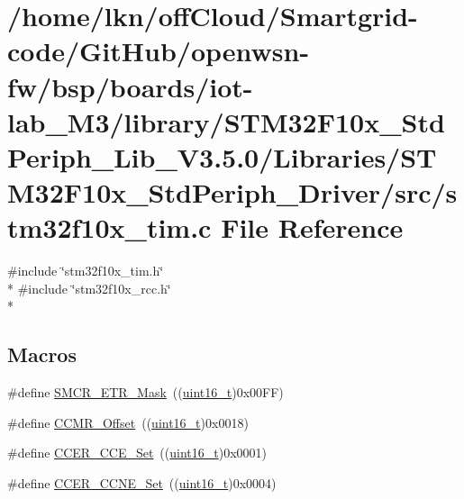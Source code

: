 \hypertarget{iot-lab___m3_2library_2_s_t_m32_f10x___std_periph___lib___v3_85_80_2_libraries_2_s_t_m32_f10x___d7bea007d76ff35c2645db50144a93b3}{}\section{/home/lkn/off\+Cloud/\+Smartgrid-\/code/\+Git\+Hub/openwsn-\/fw/bsp/boards/iot-\/lab\+\_\+\+M3/library/\+S\+T\+M32\+F10x\+\_\+\+Std\+Periph\+\_\+\+Lib\+\_\+\+V3.5.0/\+Libraries/\+S\+T\+M32\+F10x\+\_\+\+Std\+Periph\+\_\+\+Driver/src/stm32f10x\+\_\+tim.c File Reference}
\label{iot-lab___m3_2library_2_s_t_m32_f10x___std_periph___lib___v3_85_80_2_libraries_2_s_t_m32_f10x___d7bea007d76ff35c2645db50144a93b3}
{\ttfamily \#include \char`\"{}stm32f10x\+\_\+tim.\+h\char`\"{}}\\*
{\ttfamily \#include \char`\"{}stm32f10x\+\_\+rcc.\+h\char`\"{}}\\*
\subsection*{Macros}
\begin{DoxyCompactItemize}
\item 
\#define \hyperlink{group___t_i_m___private___defines_ga43819484b70fd8f2f2aa02d4131c9841}{S\+M\+C\+R\+\_\+\+E\+T\+R\+\_\+\+Mask}~((\hyperlink{_p_e___types_8h_a1f1825b69244eb3ad2c7165ddc99c956}{uint16\+\_\+t})0x00\+F\+F)
\item 
\#define \hyperlink{group___t_i_m___private___defines_ga76469c9f56da4e7705336a6ac0248196}{C\+C\+M\+R\+\_\+\+Offset}~((\hyperlink{_p_e___types_8h_a1f1825b69244eb3ad2c7165ddc99c956}{uint16\+\_\+t})0x0018)
\item 
\#define \hyperlink{group___t_i_m___private___defines_ga17c4ed624aa62f19fd496c3f3bd61137}{C\+C\+E\+R\+\_\+\+C\+C\+E\+\_\+\+Set}~((\hyperlink{_p_e___types_8h_a1f1825b69244eb3ad2c7165ddc99c956}{uint16\+\_\+t})0x0001)
\item 
\#define \hyperlink{group___t_i_m___private___defines_ga167dfdf613827d1fdf2e4152497b4bd5}{C\+C\+E\+R\+\_\+\+C\+C\+N\+E\+\_\+\+Set}~((\hyperlink{_p_e___types_8h_a1f1825b69244eb3ad2c7165ddc99c956}{uint16\+\_\+t})0x0004)
\end{DoxyCompactItemize}
